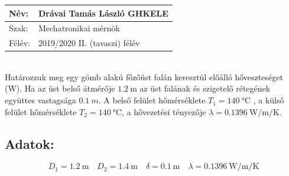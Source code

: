 \documentclass[12pt, a4paper, onecolumn]{article}
\begin{document}
\begin{tabular}{ | p{2cm} | p{14cm} | } 
	\hline
	Név: & Drávai Tamás László GHKELE\\ 
	\hline
	Szak: & Mechatronikai mérnök \\ 
	\hline
	Félév: & 2019/2020 II. (tavaszi) félév \\ 
\hline
\end{tabular}
\vspace{4mm} 
\\Határozzuk meg egy gömb alakú főzőüst falán keresztül előálló hőveszteséget (W).  Ha az üst belső átmérője $\SI{1,2}{\meter}$  az üst falának és szigetelő rétegének együttes vastagsága $\SI{0,1}{m}$. A belső felület hőmérséklete $T_1=\SI{140}{\celsius}$ , a külső felület hőmérséklete  $T_2=\SI{140}{\celsius}$,  a hővezetési tényezője $\lambda=\SI[per-mode=fraction]{0,1396}{\watt\per\meter\per\kelvin}$.
\subsection*{ {Adatok:}}
\begin{equation*}
D_1=\SI{1,2}{\meter}  \quad  D_2=\SI{1,4}{\meter} \quad \delta=\SI{0,1}{\meter}\quad
\lambda=\SI[per-mode=fraction]{0,1396}{\watt\per\meter\per\kelvin}
\end{equation*}
\end{document}
